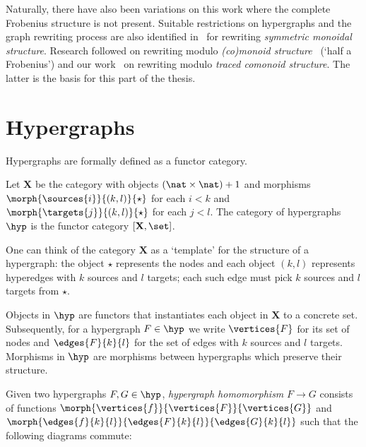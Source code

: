 
Naturally, there have also been variations on this work where the complete
Frobenius structure is not present.
Suitable restrictions on hypergraphs and the graph rewriting process are also
identified in~\cite{bonchi2016rewriting} for rewriting
\emph{symmetric monoidal structure}.
Research followed on rewriting modulo
\emph{(co)monoid structure}~\cite{milosavljevic2023string} (`half a Frobenius')
and our work~\cite{ghica2023rewriting} on rewriting modulo
\emph{traced comonoid structure}.
The latter is the basis for this part of the thesis.

\section{Hypergraphs}

Hypergraphs are formally defined as a functor category.


\begin{definition}
    Let \(\mathbf{X}\) be the category with objects
    \((\nat \times \nat) + 1\) and morphisms
    \(\morph{\sources{i}}{(k,l)}{\star}\) for each \(i < k\) and
    \(\morph{\targets{j}}{(k,l)}{\star}\) for each \(j < l\).
    The category of hypergraphs \(\hyp\) is the functor category
    \([\mathbf{X}, \set]\).
\end{definition}

One can think of the category \(\mathbf{X}\) as a `template' for the structure
of a hypergraph: the object \(\star\) represents the nodes and each object
\((k, l)\) represents hyperedges with \(k\) sources and \(l\) targets; each such
edge must pick \(k\) sources and \(l\) targets from \(\star\).

Objects in \(\hyp\) are functors that instantiates each object in \(\mathbf{X}\)
to a concrete set.
Subsequently, for a hypergraph \(F \in \hyp\) we write \(\vertices{F}\) for its
set of nodes and \(\edges{F}{k}{l}\) for the set of edges with \(k\) sources and
\(l\) targets.
Morphisms in \(\hyp\) are morphisms between hypergraphs which preserve their
structure.

\begin{definition}
    Given two hypergraphs \(F, G \in \hyp\), \emph{hypergraph homomorphism}
    \(F \to G\) consists of functions
    \(\morph{\vertices{f}}{\vertices{F}}{\vertices{G}}\) and
    \(\morph{\edges{f}{k}{l}}{\edges{F}{k}{l}}{\edges{G}{k}{l}}\) such that the
    following diagrams commute:
    
\end{definition}

